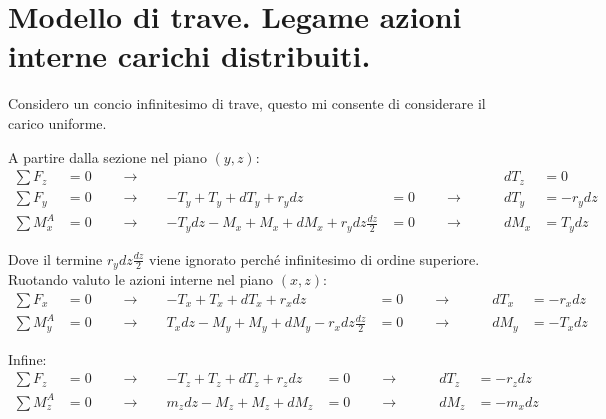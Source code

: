 \section{Modello di trave. Legame azioni interne carichi distribuiti.}

Considero un concio infinitesimo di trave, questo mi consente di considerare il carico uniforme.

A partire dalla sezione nel piano $(y,z)$:
\begin{align*}
    \sum F_z &=0 \quad\quad \rightarrow \quad &&&dT_z &= 0\\
    \sum F_y &=0 \quad\quad \rightarrow \quad &-T_y +T_y+dT_y +r_ydz &= 0 \quad\quad \rightarrow \quad\quad &dT_y &= -r_ydz\\
    \sum M_x^A &=0 \quad\quad \rightarrow \quad &-T_ydz-M_x+M_x+dM_x +r_ydz\frac{dz}{2} &= 0 \quad\quad \rightarrow \quad\quad &dM_x &= T_ydz
\end{align*}

Dove il termine $r_ydz\frac{dz}{2}$ viene ignorato perché infinitesimo di ordine superiore. Ruotando valuto le azioni interne nel piano $(x,z)$:
\begin{align*}
    \sum F_x &=0 \quad\quad \rightarrow \quad &-T_x +T_x+dT_x +r_xdz &= 0 \quad\quad \rightarrow \quad\quad &dT_x &= -r_xdz\\
    \sum M_y^A &=0 \quad\quad \rightarrow \quad &T_xdz-M_y+M_y+dM_y -r_xdz\frac{dz}{2} &= 0 \quad\quad \rightarrow \quad\quad &dM_y &= -T_xdz
\end{align*}

Infine:
\begin{align*}
    \sum F_z &=0 \quad\quad \rightarrow \quad &-T_z +T_z+dT_z +r_zdz &= 0 \quad\quad \rightarrow \quad\quad &dT_z &= -r_zdz\\
    \sum M_z^A &=0 \quad\quad \rightarrow \quad &m_zdz-M_z+M_z+dM_z  &= 0 \quad\quad \rightarrow \quad\quad &dM_z &= -m_xdz
\end{align*}

